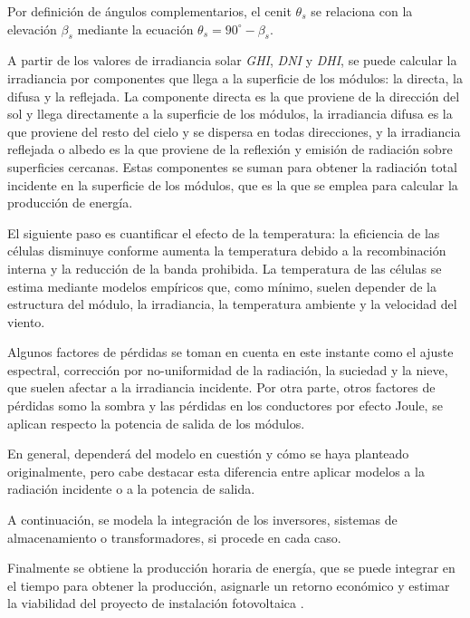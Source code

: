 Por definición de \gls{ángulos complementarios}, el \gls{cenit} $\theta_s$ se relaciona con la elevación $\beta_s$ mediante la ecuación $\theta_s = 90^\circ - \beta_s$.

A partir de los valores de irradiancia solar \textit{\gls{GHI}}, \textit{\gls{DNI}} y \textit{\gls{DHI}}, se puede calcular la irradiancia por componentes que llega a la superficie de los módulos: la \gls{directa}, la \gls{difusa} y la \gls{reflejada}. La componente directa es la que proviene de la dirección del sol y llega directamente a la superficie de los módulos, la irradiancia difusa es la que proviene del resto del cielo y se dispersa en todas direcciones, y la irradiancia reflejada o \gls{albedo} es la que proviene de la reflexión y emisión de radiación sobre superficies cercanas. Estas componentes se suman para obtener la radiación total incidente en la superficie de los módulos, que es la que se emplea para calcular la producción de energía.

El siguiente paso es cuantificar el efecto de la temperatura: la eficiencia de las células disminuye conforme aumenta la temperatura debido a la \gls{recombinación interna} y la reducción de la \gls{banda prohibida}. La temperatura de las células se estima mediante modelos empíricos que, como mínimo, suelen depender de la estructura del \gls{módulo}, la irradiancia, la temperatura ambiente y la velocidad del viento.

Algunos factores de pérdidas se toman en cuenta en este instante como el \gls{ajuste espectral}, corrección por no-uniformidad de la radiación, la suciedad y la nieve, que suelen afectar a la irradiancia incidente. Por otra parte, otros factores de pérdidas somo la \gls{sombra} y las pérdidas en los conductores por \gls{efecto Joule}, se aplican respecto la potencia de salida de los módulos.

En general, dependerá del modelo en cuestión y cómo se haya planteado originalmente, pero cabe destacar esta diferencia entre aplicar modelos a la radiación incidente o a la potencia de salida.

A continuación, se modela la integración de los \gls{inversores}, \gls{sistemas de almacenamiento} o \gls{transformadores}, si procede en cada caso.

Finalmente se obtiene la producción horaria de energía, que se puede integrar en el tiempo para obtener la producción, asignarle un retorno económico y estimar la viabilidad del proyecto de instalación fotovoltaica \cite{Rosa-Clot_Tina_2020}.

